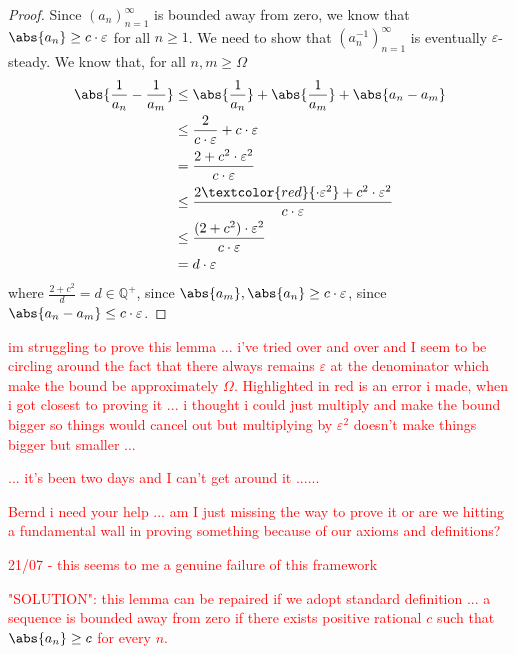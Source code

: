 { \label{lem:3}
\begin{proof}
    Since  $(a_n)_{n=1}^{\infty}$ is bounded away from zero, we know that $\abs{a_n} \geq c \cdot \varepsilon$ for all $n \geq 1$. We need to show that $(a_n^{-1})_{n=1}^{\infty}$ is eventually $\varepsilon$-steady. We know that, for all $n,m \geq \Omega$
    \begin{align*}
        \abs{\frac{1}{a_n} - \frac{1}{a_m}} & \leq \abs{\frac{1}{a_n}} + \abs{\frac{1}{a_m}} + \abs{a_n-a_m} \\
        & \leq \frac{2}{c \cdot \varepsilon} + c \cdot \varepsilon \\
        & = \frac{2+c^2 \cdot \varepsilon^2}{c \cdot \varepsilon} \\
        & \leq \frac{2 \textcolor{red}{\cdot \varepsilon^2}+c^2 \cdot \varepsilon^2}{c \cdot \varepsilon} \\
        & \leq \frac{(2+c^2) \cdot \varepsilon^2}{c \cdot \varepsilon} \\
        & = d \cdot \varepsilon
    \end{align*}
    where $\frac{2+c^2}{d}=d \in \mathbb{Q}^+$, since $\abs{a_m}, \abs{a_n} \geq c \cdot \varepsilon$, since $\abs{a_n-a_m} \leq c \cdot \varepsilon$. 
\end{proof}
\textcolor{red}{im struggling to prove this lemma ... i've tried over and over and I seem to be circling around the fact that there always remains $\varepsilon$ at the denominator which make the bound be approximately $\Omega$. Highlighted in red is an error i made, when i got closest to proving it ... i thought i could just multiply and make the bound bigger so things would cancel out but multiplying by $\varepsilon^2$ doesn't make things bigger but smaller ...}

\textcolor{red}{  ... it's been two days and I can't get around it ......}

\textcolor{red}{Bernd i need your help ... am I just missing the way to prove it or are we hitting a fundamental wall in proving something because of our axioms and definitions?}

\textcolor{red}{21/07 - this seems to me a genuine failure of this framework}

\textcolor{red}{"SOLUTION": this lemma can be repaired if we adopt standard definition ... a sequence is bounded away from zero if there exists positive rational $c$ such that $\abs{a_n}\geq c$ for every $n$.}

}
